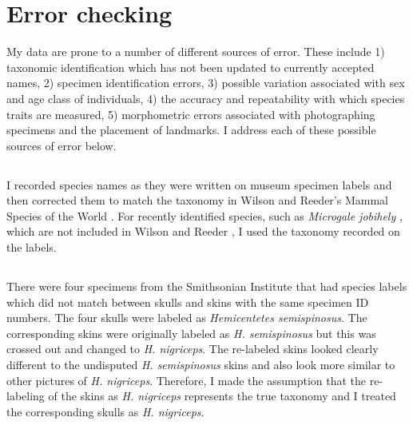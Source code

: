 \section{Error checking}
\label{sect:errors}
	My data are prone to a number of different sources of error. These include 1) taxonomic identification which has not been updated to currently accepted names, 2) specimen identification errors, 3) possible variation associated with sex and age class of individuals, 4) the accuracy and repeatability with which species traits are measured, 5) morphometric errors associated with photographing specimens and the placement of landmarks. I address each of these possible sources of error below.  

\subsection{}
	I recorded species names as they were written on museum specimen labels and then corrected them to match the taxonomy in Wilson and Reeder's Mammal Species of the World \citeyearpar{Wilson2005}. For recently identified species, such as \textit{Microgale jobihely} \citep{Goodman2006}, which are not included in Wilson and Reeder \citeyearpar{Wilson2005}, I used the taxonomy recorded on the labels. 

\subsection{}
	
	There were four specimens from the Smithsonian Institute that had species labels which did not match between skulls and skins with the same specimen ID numbers. The four skulls were labeled as \textit{Hemicentetes semispinosus}. The corresponding skins were originally labeled as \textit{H. semispinosus} but this was crossed out and changed to \textit{H. nigriceps}. The re-labeled skins looked clearly different to the undisputed \textit{H. semispinosus} skins and also look more similar to other pictures of \textit{H. nigriceps}. Therefore, I made the assumption that the re-labeling of the skins as \textit{H. nigriceps} represents the true taxonomy and I treated the corresponding skulls as \textit{H. nigriceps}.

